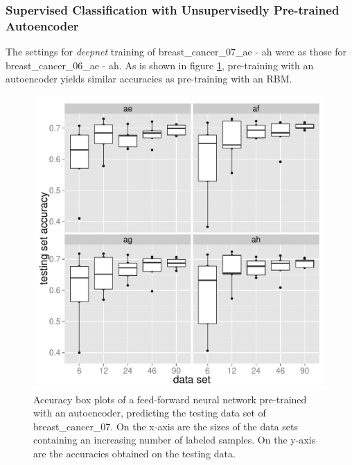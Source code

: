 \subsubsection{Supervised Classification with Unsupervisedly Pre-trained Autoencoder}

The settings for \emph{deepnet }training of breast\_cancer\_07\_ae
- ah were as those for breast\_cancer\_06\_ae - ah. As is shown in
figure \ref{fig:Accuracy-box-plots-of-breast_cancer_07_ae-ah}, pre-training
with an autoencoder yields similar accuracies as pre-training with
an RBM.

\begin{figure}
\begin{centering}
\includegraphics[width=0.68\paperwidth]{images/breast_cancer_07-accuracies-ae_ah.pdf}
\par\end{centering}
\caption[Accuracy box plots of a feed-forward neural network pre-trained with
an autoencoder, predicting the testing data set of breast\_cancer\_07.]{\label{fig:Accuracy-box-plots-of-breast_cancer_07_ae-ah}Accuracy
box plots of a feed-forward neural network pre-trained with an autoencoder,
predicting the testing data set of breast\_cancer\_07. On the x-axis
are the sizes of the data sets containing an increasing number of
labeled samples. On the y-axis are the accuracies obtained on the
testing data.}
\end{figure}

